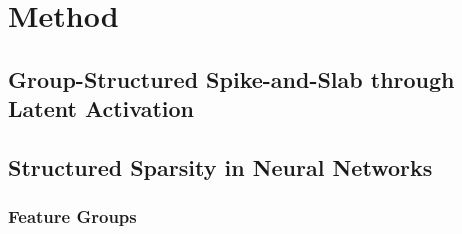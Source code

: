 \documentclass{article}
\begin{document}
\section{Method}
\label{sec:method}



\subsection{Group-Structured Spike-and-Slab through Latent Activation}
\label{sec:group_lvr}

%
%
%
%
%
%
%
%
%
%
%
%



\subsection{Structured Sparsity in Neural Networks}
\label{sec:nn_structure}

%
%
%
%
%


\subsubsection{Feature Groups}
\label{sec:feature_groups}

%
%
%
%
%
%
%
\end{document}
